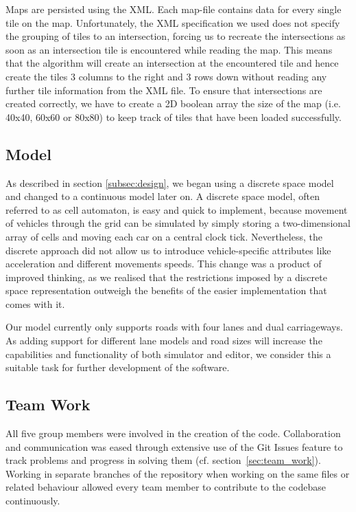 Maps are persisted using the XML. Each map-file contains data for every single tile on the map. Unfortunately, the XML specification we used does not specify the grouping of tiles to an intersection, forcing us to recreate the intersections as soon as an intersection tile is encountered while reading the map. This means that the algorithm will create an intersection at the encountered tile and hence create the tiles 3 columns to the right and 3 rows down without reading any further tile information from the XML file. To ensure that intersections are created correctly, we have to create a 2D boolean array the size of the map (i.e. 40x40, 60x60 or 80x80) to keep track of tiles that have been loaded successfully. 

\subsection*{Model}
As described in section \ref{subsec:design}, we began using a discrete space model and changed to a continuous model later on. A discrete space model, often referred to as cell automaton, is easy and quick to implement, because movement of vehicles through the grid can be simulated by simply storing a two-dimensional array of cells and moving each car on a central clock tick. Nevertheless, the discrete approach did not allow us to introduce vehicle-specific attributes like acceleration and different movements speeds.
 This change was a product of improved thinking, as we realised that the restrictions imposed by a discrete space representation outweigh the benefits of the easier implementation that comes with it.

Our model currently only supports roads with four lanes and dual carriageways. As adding support for different lane models and road sizes will increase the capabilities and functionality of both simulator and editor, we consider this a suitable task for further development of the software.


\subsection*{Team Work}
All five group members were involved in the creation of the code. Collaboration and communication was eased through extensive use of the Git Issues feature to track problems and progress in solving them (cf. section~\ref{sec:team_work}). Working in separate branches of the repository when working on the same files or related behaviour allowed every team member to contribute to the codebase continuously.  
